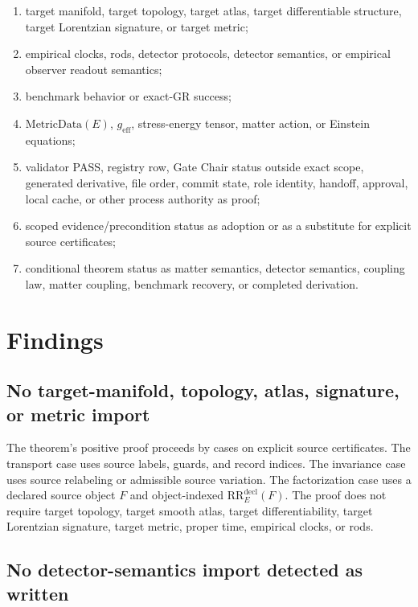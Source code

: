 \documentclass[11pt]{article}
\newcommand{\RREObj}{\mathrm{RR}_{E}^{\mathrm{decl}}}
\newcommand{\MetricData}{\mathrm{MetricData}}
\newcommand{\geff}{g_{\mathrm{eff}}}
\begin{document}
\begin{enumerate}[label=(\arabic*)]
  \item target manifold, target topology, target atlas, target differentiable
        structure, target Lorentzian signature, or target metric;
  \item empirical clocks, rods, detector protocols, detector semantics, or
        empirical observer readout semantics;
  \item benchmark behavior or exact-GR success;
  \item \(\MetricData(E)\), \(\geff\), stress-energy tensor, matter action,
        or Einstein equations;
  \item validator PASS, registry row, Gate Chair status outside exact scope,
        generated derivative, file order, commit state, role identity,
        handoff, approval, local cache, or other process authority as proof;
  \item scoped evidence/precondition status as adoption or as a substitute for
        explicit source certificates;
  \item conditional theorem status as matter semantics, detector semantics,
        coupling law, matter coupling, benchmark recovery, or completed
        derivation.
\end{enumerate}

\section{Findings}

\subsection{No target-manifold, topology, atlas, signature, or metric import}

The theorem's positive proof proceeds by cases on explicit source
certificates. The transport case uses source labels, guards, and record
indices. The invariance case uses source relabeling or admissible source
variation. The factorization case uses a declared source object \(F\) and
object-indexed \(\RREObj(F)\). The proof does not require target topology,
target smooth atlas, target differentiability, target Lorentzian signature,
target metric, proper time, empirical clocks, or rods.

\subsection{No detector-semantics import detected as written}
\end{document}

